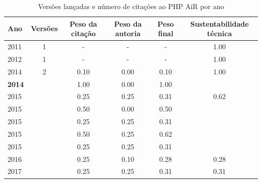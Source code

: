 \begin{table}[H]
\caption{Versões lançadas e número de citações ao PHP AiR por ano}
\centering
\begin{tabular}{| l | c | c | c | c | c |}
  \hline
  Ano & Versões & Peso da citação & Peso da autoria & Peso final & Sustentabilidade técnica \\
  \hline
        2011 & 1 & - & - & -
        &
          {\color{blue} 1.00}
        \\
\hline
        2012 & 1 & - & - & -
        &
          {\color{blue} 1.00}
        \\
\hline
            2014
          &
          2
          &
          0.10
          &
          0.00
          &
          0.10
          &
            {\color{blue} 1.00}
          \\
            {\bf 2014}
          &
          
          &
          1.00
          &
          0.00
          &
          1.00
          &
          \\
\hline
            2015
          &
          
          &
          0.25
          &
          0.25
          &
          0.31
          &
            {\color{blue} 0.62}
          \\
            2015
          &
          
          &
          0.50
          &
          0.00
          &
          0.50
          &
          \\
            2015
          &
          
          &
          0.25
          &
          0.25
          &
          0.31
          &
          \\
            2015
          &
          
          &
          0.50
          &
          0.25
          &
          0.62
          &
          \\
            2015
          &
          
          &
          0.25
          &
          0.25
          &
          0.31
          &
          \\
\hline
            2016
          &
          
          &
          0.25
          &
          0.10
          &
          0.28
          &
            {\color{red} 0.28}
          \\
\hline
            2017
          &
          
          &
          0.25
          &
          0.25
          &
          0.31
          &
            {\color{red} 0.31}
          \\
\hline
\end{tabular}
\end{table}

